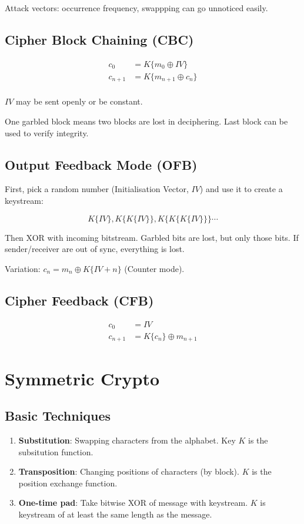 \documentclass{article}
\begin{document}
Attack vectors: occurrence frequency, swappping can go unnoticed easily.

\subsection{Cipher Block Chaining (CBC)}

\begin{align*}
  c_0     &= K\{m_0 \oplus IV\} \\
  c_{n+1} &= K\{m_{n+1} \oplus c_n\} \\
\end{align*}

$IV$ may be sent openly or be constant.

One garbled block means two blocks are lost in deciphering. Last block
can be used to verify integrity.

\subsection{Output Feedback Mode (OFB)}

First, pick a random number (Initialisation Vector, $IV$) and use it to
create a keystream:

\[ K\{IV\},K\{K\{IV\}\}, K\{K\{K\{IV\}\}\} \cdots \]

Then XOR with incoming bitstream. Garbled bits are lost, but only those bits.
If sender/receiver are out of sync, everything is lost.

Variation: $c_n = m_n \oplus K\{IV + n\}$ (Counter mode).

\subsection{Cipher Feedback (CFB)}

\begin{align*}
  c_0 &= IV \\
  c_{n+1} &= K\{c_n\} \oplus m_{n+1}
\end{align*}

\section{Symmetric Crypto}

\subsection{Basic Techniques}

\begin{enumerate}

  \item \textbf{Substitution}: Swapping characters from the alphabet. Key $K$
    is the subsitution function.

  \item \textbf{Transposition}: Changing positions of characters (by block).
    $K$ is the position exchange function.

  \item \textbf{One-time pad}: Take bitwise XOR of message with keystream.
    $K$ is keystream of at least the same length as the message.

\end{enumerate}
\end{document}
